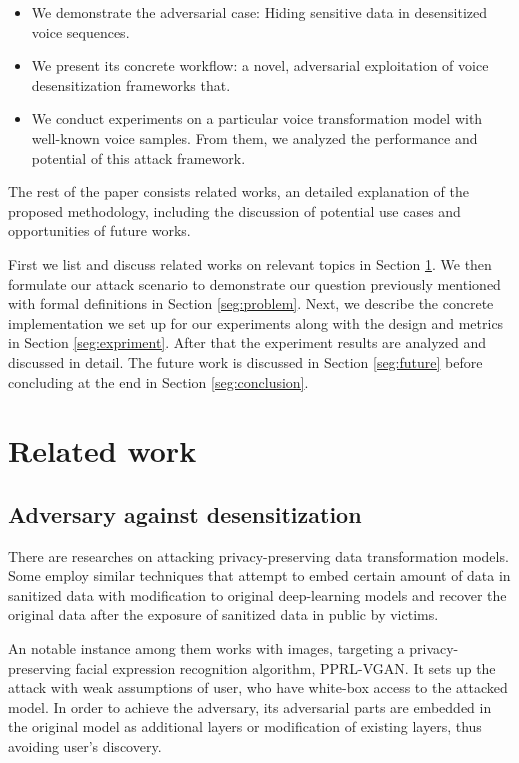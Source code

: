 \documentclass[journal]{IEEEtran} %
\begin{document}
\begin{itemize}

\item We demonstrate the adversarial case: Hiding sensitive data in desensitized voice sequences.

\item We present its concrete workflow: a novel, adversarial exploitation of voice desensitization frameworks that.

\item We conduct experiments on a particular voice transformation model with well-known voice samples. From them, we analyzed the performance and potential of this attack framework.

\end{itemize}

The rest of the paper consists related works, an detailed explanation of the proposed methodology, including the discussion of potential use cases and opportunities of future works.

First we list and discuss related works on relevant topics in Section \ref{seg:related}. We then formulate our attack scenario to demonstrate our question previously mentioned with formal definitions in Section \ref{seg:problem}. Next, we describe the concrete implementation we set up for our experiments along with the design and metrics in Section \ref{seg:expriment}. After that the experiment results are analyzed and discussed in detail. The future work is discussed in Section \ref{seg:future} before concluding at the end in Section \ref{seg:conclusion}.

\section{Related work}
\label{seg:related}

\subsection{Adversary against desensitization}

There are researches on attacking privacy-preserving data transformation models. Some employ similar techniques that attempt to embed certain amount of data in sanitized data with modification to original deep-learning models and recover the original data after the exposure of sanitized data in public by victims. 

An notable instance among them works with images, targeting a privacy-preserving facial expression recognition algorithm, PPRL-VGAN. It sets up the attack with weak assumptions of user, who have white-box access to the attacked model. In order to achieve the adversary, its adversarial parts are embedded in the original model as additional layers or modification of existing layers, thus avoiding user's discovery.\cite{pprl-vgan,subvert}
\end{document}
